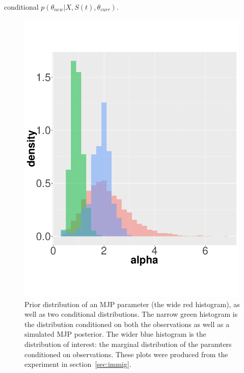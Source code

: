 conditional $p(\theta_{new}|X,S(t),\theta_{curr})$. 
  \begin{figure}%
  \centering
  \begin{minipage}[hp]{0.44\linewidth}
  \centering
    \includegraphics [width=0.99\textwidth, angle=0]{figs/hist_alpha.pdf}
    \vspace{-0 in}
  \end{minipage}
  \begin{minipage}[hp]{0.55\linewidth}
    \vspace{-0.8 in}
  \caption{Prior distribution of an MJP parameter (the wide red histogram),
  as well as two conditional distributions. The narrow green histogram is the
distribution conditioned on both the observations as well as a simulated
MJP posterior. The wider blue histogram is the distribution of interest: the
marginal distribution of the paramters conditioned on observations. These
plots were produced from the experiment in section~\ref{sec:immig}.}
     \label{fig:hist}
  \end{minipage}
  \end{figure}
